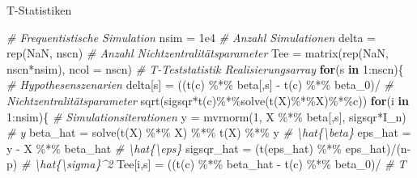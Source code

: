 \documentclass[
  8pt,
  ignorenonframetext,
]{beamer}
\newenvironment{Shaded}{\begin{snugshade}}{\end{snugshade}}
\newcommand{\AttributeTok}[1]{\textcolor[rgb]{0.77,0.63,0.00}{#1}}
\newcommand{\CommentTok}[1]{\textcolor[rgb]{0.56,0.35,0.01}{\textit{#1}}}
\newcommand{\ConstantTok}[1]{\textcolor[rgb]{0.00,0.00,0.00}{#1}}
\newcommand{\ControlFlowTok}[1]{\textcolor[rgb]{0.13,0.29,0.53}{\textbf{#1}}}
\newcommand{\DecValTok}[1]{\textcolor[rgb]{0.00,0.00,0.81}{#1}}
\newcommand{\FloatTok}[1]{\textcolor[rgb]{0.00,0.00,0.81}{#1}}
\newcommand{\FunctionTok}[1]{\textcolor[rgb]{0.00,0.00,0.00}{#1}}
\newcommand{\NormalTok}[1]{#1}
\newcommand{\OtherTok}[1]{\textcolor[rgb]{0.56,0.35,0.01}{#1}}
\newcommand{\SpecialCharTok}[1]{\textcolor[rgb]{0.00,0.00,0.00}{#1}}
\begin{document}
\begin{frame}[fragile]{T-Statistiken}
\begin{Shaded}
\begin{Highlighting}[]
\CommentTok{\# Frequentistische Simulation}
\NormalTok{nsim       }\OtherTok{=} \FloatTok{1e4}                                               \CommentTok{\# Anzahl Simulationen}
\NormalTok{delta      }\OtherTok{=} \FunctionTok{rep}\NormalTok{(}\ConstantTok{NaN}\NormalTok{, nscn)                                    }\CommentTok{\# Anzahl Nichtzentralitätsparameter}
\NormalTok{Tee        }\OtherTok{=} \FunctionTok{matrix}\NormalTok{(}\FunctionTok{rep}\NormalTok{(}\ConstantTok{NaN}\NormalTok{, nscn}\SpecialCharTok{*}\NormalTok{nsim), }\AttributeTok{ncol =}\NormalTok{ nscn)          }\CommentTok{\# T{-}Teststatistik Realisierungsarray}
\ControlFlowTok{for}\NormalTok{(s }\ControlFlowTok{in} \DecValTok{1}\SpecialCharTok{:}\NormalTok{nscn)\{                                              }\CommentTok{\# Hypothesenszenarien}
\NormalTok{  delta[s]    }\OtherTok{=}\NormalTok{ ((}\FunctionTok{t}\NormalTok{(c) }\SpecialCharTok{\%*\%}\NormalTok{ beta[,s] }\SpecialCharTok{{-}} \FunctionTok{t}\NormalTok{(c) }\SpecialCharTok{\%*\%}\NormalTok{ beta\_0)}\SpecialCharTok{/}        \CommentTok{\# Nichtzentralitätsparameter}
                \FunctionTok{sqrt}\NormalTok{(sigsqr}\SpecialCharTok{*}\FunctionTok{t}\NormalTok{(c)}\SpecialCharTok{\%*\%}\FunctionTok{solve}\NormalTok{(}\FunctionTok{t}\NormalTok{(X)}\SpecialCharTok{\%*\%}\NormalTok{X)}\SpecialCharTok{\%*\%}\NormalTok{c))}
  \ControlFlowTok{for}\NormalTok{(i }\ControlFlowTok{in} \DecValTok{1}\SpecialCharTok{:}\NormalTok{nsim)\{                                            }\CommentTok{\# Simulationsiterationen}
\NormalTok{    y          }\OtherTok{=} \FunctionTok{mvrnorm}\NormalTok{(}\DecValTok{1}\NormalTok{, X }\SpecialCharTok{\%*\%}\NormalTok{ beta[,s], sigsqr}\SpecialCharTok{*}\NormalTok{I\_n)        }\CommentTok{\# y}
\NormalTok{    beta\_hat   }\OtherTok{=} \FunctionTok{solve}\NormalTok{(}\FunctionTok{t}\NormalTok{(X) }\SpecialCharTok{\%*\%}\NormalTok{ X) }\SpecialCharTok{\%*\%} \FunctionTok{t}\NormalTok{(X) }\SpecialCharTok{\%*\%}\NormalTok{ y              }\CommentTok{\# \textbackslash{}hat\{\textbackslash{}beta\}}
\NormalTok{    eps\_hat    }\OtherTok{=}\NormalTok{ y }\SpecialCharTok{{-}}\NormalTok{ X }\SpecialCharTok{\%*\%}\NormalTok{ beta\_hat                            }\CommentTok{\# \textbackslash{}hat\{\textbackslash{}eps\}}
\NormalTok{    sigsqr\_hat }\OtherTok{=}\NormalTok{ (}\FunctionTok{t}\NormalTok{(eps\_hat) }\SpecialCharTok{\%*\%}\NormalTok{ eps\_hat)}\SpecialCharTok{/}\NormalTok{(n}\SpecialCharTok{{-}}\NormalTok{p)                }\CommentTok{\# \textbackslash{}hat\{\textbackslash{}sigma\}\^{}2}
\NormalTok{    Tee[i,s]   }\OtherTok{=}\NormalTok{ ((}\FunctionTok{t}\NormalTok{(c) }\SpecialCharTok{\%*\%}\NormalTok{ beta\_hat }\SpecialCharTok{{-}} \FunctionTok{t}\NormalTok{(c) }\SpecialCharTok{\%*\%}\NormalTok{ beta\_0)}\SpecialCharTok{/}       \CommentTok{\# T}

\end{Highlighting}
\end{Shaded}
\end{frame}
\end{document}
